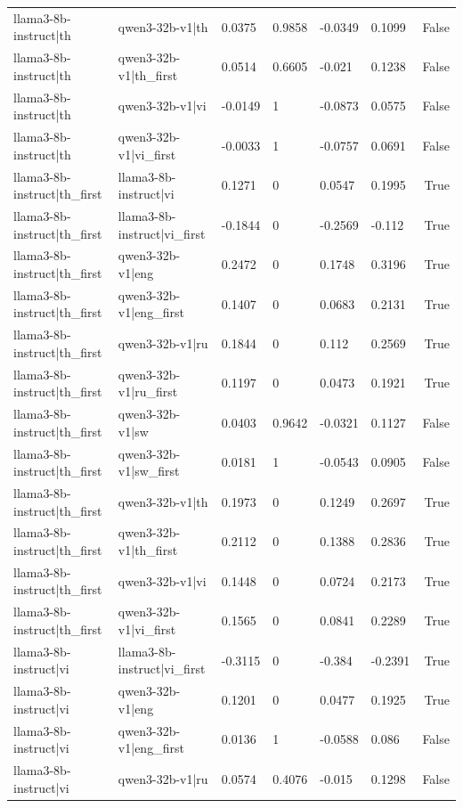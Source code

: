 \begin{table}
\begin{tabular}{llllllr}
llama3-8b-instruct|th & qwen3-32b-v1|th & 0.0375 & 0.9858 & -0.0349 & 0.1099 & False \\
llama3-8b-instruct|th & qwen3-32b-v1|th_first & 0.0514 & 0.6605 & -0.021 & 0.1238 & False \\
llama3-8b-instruct|th & qwen3-32b-v1|vi & -0.0149 & 1 & -0.0873 & 0.0575 & False \\
llama3-8b-instruct|th & qwen3-32b-v1|vi_first & -0.0033 & 1 & -0.0757 & 0.0691 & False \\
llama3-8b-instruct|th_first & llama3-8b-instruct|vi & 0.1271 & 0 & 0.0547 & 0.1995 & True \\
llama3-8b-instruct|th_first & llama3-8b-instruct|vi_first & -0.1844 & 0 & -0.2569 & -0.112 & True \\
llama3-8b-instruct|th_first & qwen3-32b-v1|eng & 0.2472 & 0 & 0.1748 & 0.3196 & True \\
llama3-8b-instruct|th_first & qwen3-32b-v1|eng_first & 0.1407 & 0 & 0.0683 & 0.2131 & True \\
llama3-8b-instruct|th_first & qwen3-32b-v1|ru & 0.1844 & 0 & 0.112 & 0.2569 & True \\
llama3-8b-instruct|th_first & qwen3-32b-v1|ru_first & 0.1197 & 0 & 0.0473 & 0.1921 & True \\
llama3-8b-instruct|th_first & qwen3-32b-v1|sw & 0.0403 & 0.9642 & -0.0321 & 0.1127 & False \\
llama3-8b-instruct|th_first & qwen3-32b-v1|sw_first & 0.0181 & 1 & -0.0543 & 0.0905 & False \\
llama3-8b-instruct|th_first & qwen3-32b-v1|th & 0.1973 & 0 & 0.1249 & 0.2697 & True \\
llama3-8b-instruct|th_first & qwen3-32b-v1|th_first & 0.2112 & 0 & 0.1388 & 0.2836 & True \\
llama3-8b-instruct|th_first & qwen3-32b-v1|vi & 0.1448 & 0 & 0.0724 & 0.2173 & True \\
llama3-8b-instruct|th_first & qwen3-32b-v1|vi_first & 0.1565 & 0 & 0.0841 & 0.2289 & True \\
llama3-8b-instruct|vi & llama3-8b-instruct|vi_first & -0.3115 & 0 & -0.384 & -0.2391 & True \\
llama3-8b-instruct|vi & qwen3-32b-v1|eng & 0.1201 & 0 & 0.0477 & 0.1925 & True \\
llama3-8b-instruct|vi & qwen3-32b-v1|eng_first & 0.0136 & 1 & -0.0588 & 0.086 & False \\
llama3-8b-instruct|vi & qwen3-32b-v1|ru & 0.0574 & 0.4076 & -0.015 & 0.1298 & False \\

\end{tabular}
\end{table}

